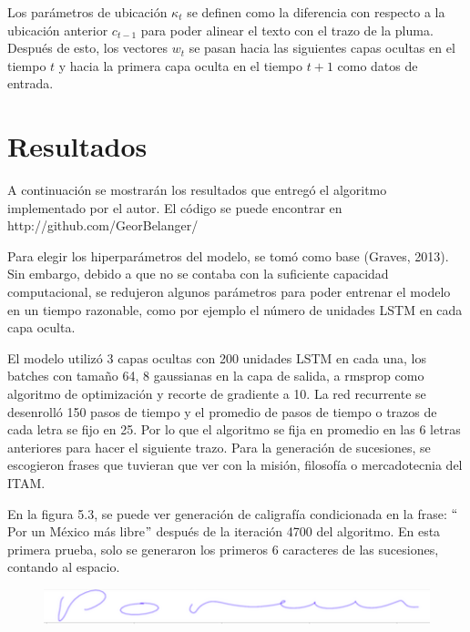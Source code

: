 Los parámetros de ubicación $\kappa_t$ se definen como la diferencia con respecto a la ubicación anterior $c_{t-1}$ para poder alinear el texto con el trazo de la pluma. Después de esto, los vectores $w_t$ se pasan hacia las siguientes capas ocultas en el tiempo $t$ y hacia la primera capa oculta en el tiempo $t+1$ como datos de entrada.


\section{Resultados}

A continuación se mostrarán los resultados que entregó el algoritmo implementado por el autor. El código se puede encontrar en http://github.com/GeorBelanger/

\vspace{1em}

Para elegir los hiperparámetros del modelo, se tomó como base (Graves, 2013). Sin embargo, debido a que no se contaba con la suficiente capacidad computacional, se redujeron algunos parámetros para poder entrenar el modelo en un tiempo razonable, como por ejemplo el número de unidades LSTM en cada capa oculta.

\vspace{1em}

El modelo utilizó 3 capas ocultas con 200 unidades LSTM en cada una, los batches con tamaño 64, 8 gaussianas en la capa de salida, a rmsprop como algoritmo de optimización y recorte de gradiente a 10. La red recurrente se desenrolló 150 pasos de tiempo y el promedio de pasos de tiempo o trazos de cada letra se fijo en 25. Por lo que el algoritmo se fija en promedio en las 6 letras anteriores para hacer el siguiente trazo. Para la generación de sucesiones, se escogieron frases que tuvieran que ver con la misión, filosofía o mercadotecnia del ITAM.

\vspace{1em}

 En la figura 5.3, se puede ver generación de caligrafía condicionada en la frase: $``$Por un México más libre$"$ después de la iteración 4700 del algoritmo. En esta primera prueba, solo se generaron los primeros 6 caracteres de las sucesiones, contando al espacio.


\begin{figure}[h]
\begin{center}
\includegraphics{./imag/porunmexico4700.png}
\end{center}
\caption{}
\end{figure}

